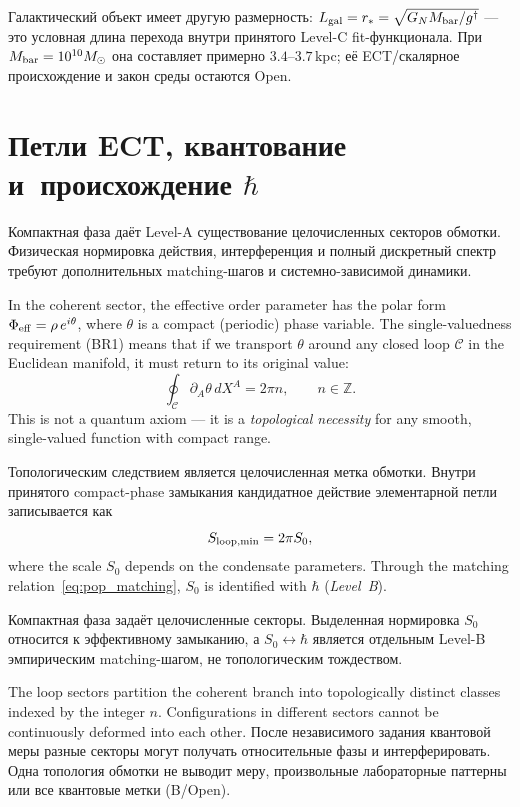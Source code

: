 \documentclass[11pt,a4paper]{article}
\begin{document}
Галактический объект имеет другую размерность:
$L_{\rm gal}=r_*=\sqrt{G_NM_{\rm bar}/g^\dagger}$ — это условная
длина перехода внутри принятого Level-C fit-функционала. При
$M_{\rm bar}=10^{10}M_\odot$ она составляет примерно
$3.4$--$3.7$\,kpc; её ECT/скалярное происхождение и закон среды
остаются Open.

\FloatBarrier

\section{Петли ECT, квантование и~происхождение $\hbar$}
\label{sec:pop_loops}

Компактная фаза даёт Level-A существование целочисленных секторов обмотки. Физическая нормировка действия, интерференция и полный дискретный спектр требуют дополнительных matching-шагов и системно-зависимой динамики.

In the coherent sector, the effective order parameter has the polar form $\Phi_{\rm eff} = \rho\,e^{i\theta}$, where $\theta$ is a compact (periodic) phase variable. The single-valuedness requirement (BR1) means that if we transport $\theta$ around any closed loop $\mathcal{C}$ in the Euclidean manifold, it must return to its original value:
\begin{equation}
  \oint_{\mathcal{C}} \partial_A\theta\,dX^A = 2\pi n,
  \qquad n \in \mathbb{Z}.
  \label{eq:pop_winding}
\end{equation}
This is not a quantum axiom --- it is a \emph{topological necessity} for any smooth, single-valued function with compact range.

Топологическим следствием является целочисленная метка обмотки. Внутри принятого compact-phase замыкания кандидатное действие элементарной петли записывается как
\begin{equation}
  S_{\rm loop,min} = 2\pi S_0,
  \label{eq:pop_Sloop}
\end{equation}
where the scale $S_0$ depends on the condensate parameters. Through the matching relation~\eqref{eq:pop_matching}, $S_0$ is identified with $\hbar$ (\emph{Level~B}).

Компактная фаза задаёт целочисленные секторы. Выделенная нормировка $S_0$ относится к эффективному замыканию, а $S_0\leftrightarrow\hbar$ является отдельным Level-B эмпирическим matching-шагом, не топологическим тождеством.

The loop sectors partition the coherent branch into topologically distinct classes indexed by the integer $n$. Configurations in different sectors cannot be continuously deformed into each other. После независимого задания квантовой меры разные секторы могут получать относительные фазы и интерферировать. Одна топология обмотки не выводит меру, произвольные лабораторные паттерны или все квантовые метки (B/Open).
\end{document}
